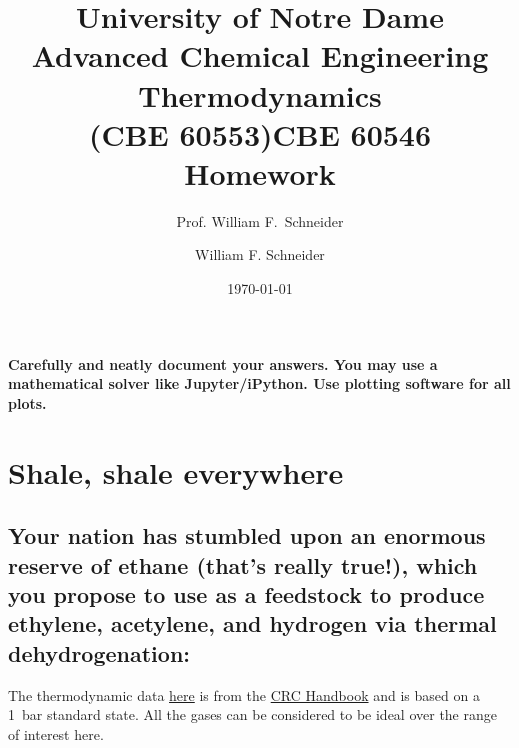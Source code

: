 \documentclass[11pt]{article}
\title{University of Notre Dame\\Advanced Chemical Engineering Thermodynamics\\(CBE 60553)}
\author{Prof. William F.\ Schneider}
\author{William F. Schneider}
\date{\today}
\title{CBE 60546 Homework}
\begin{document}
\begin{OPTIONS}
\end{OPTIONS}

\noindent \textbf{Carefully and neatly document your answers.  You may use a mathematical solver like Jupyter/iPython. Use plotting software for all plots.}

\section{Shale, shale everywhere}
\label{sec:org1a8a2a7}
\subsection{Your nation has stumbled upon an enormous reserve of ethane (that's really true!), which you propose to use as a feedstock to produce ethylene, acetylene, and hydrogen via thermal dehydrogenation:}
\label{sec:org61b349c}

\begin{center}

\end{center}
\noindent The thermodynamic data \href{./HW2-thermo.csv}{here} is from the \href{https://onesearch.library.nd.edu/permalink/f/1phik6l/ndu\_aleph002720619}{CRC Handbook} and is based on a \SI{1}{bar} standard state. All the gases can be considered to be ideal over the range of interest here.
\end{document}
